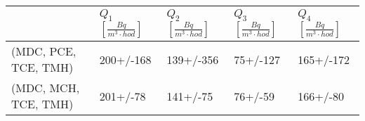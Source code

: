 \begin{tabular}{lllll}
\toprule
{} & $Q_1$ $\left[\si{\frac{Bq}{m^3\cdot hod}}\right]$ & $Q_2$ $\left[\si{\frac{Bq}{m^3\cdot hod}}\right]$ & $Q_3$ $\left[\si{\frac{Bq}{m^3\cdot hod}}\right]$ & $Q_4$ $\left[\si{\frac{Bq}{m^3\cdot hod}}\right]$ \\
\midrule
(MDC, PCE, TCE, TMH) &                                         200+/-168 &                                         139+/-356 &                                          75+/-127 &                                         165+/-172 \\
(MDC, MCH, TCE, TMH) &                                          201+/-78 &                                          141+/-75 &                                           76+/-59 &                                          166+/-80 \\
\bottomrule
\end{tabular}

